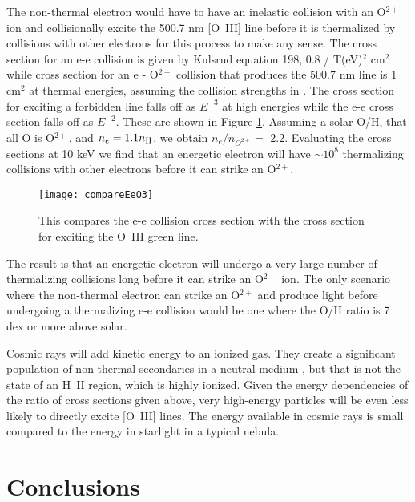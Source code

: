 \documentclass[debug, preprint, twocolumn]{rmaa}
\begin{document}
The non-thermal electron would have to have an inelastic collision with an 
O$^{2+}$ ion and collisionally excite the   500.7 nm [O~III] line 
before it is thermalized by collisions with other electrons for this process to make any sense.  
The cross section for an e-e collision is given by Kulsrud equation 198, 0.8  / T(eV)$^2$ cm$^2$ 
while cross section for an e - O$^{2+}$ collision that produces the 500.7 nm line is 1 cm$^2$
at thermal energies, 
assuming the collision strengths in \citet{1994A&AS..103..273L}.  
The cross section for exciting a forbidden line falls off as $E^{-3}$
at high energies \citep{1992A&A...254..436B} 
while the e-e cross section falls off as $E^{-2}$.
These are shown in Figure \ref{fig:compareEeO3}.
Assuming a solar O/H, that all O is O$^{2+}$, and $n_e = 1.1 n_{\rm H}$, 
we obtain $n_e / n_{O^{2+}} =$ 2.2.
Evaluating the cross sections at 10 keV we find that
an energetic electron will have $\sim 10^8$ 
thermalizing collisions with other electrons before it can strike an O$^{2+}$.  


\begin{figure}[t]
\texttt{[image: compareEeO3]}
\caption[Comparing e-e with \[O III\] collision cross sections]{This compares the e-e collision cross section
with the cross section for exciting the O~III green line.}
\label{fig:compareEeO3}
\end{figure}


The result is that an energetic electron will undergo a very large number of thermalizing collisions
long before it can strike an O$^{2+}$ ion.  
The only scenario where the non-thermal electron can strike an O$^{2+}$ and produce light 
before undergoing a thermalizing  e-e collision would be one where the O/H ratio is 
7 dex or more above solar.

Cosmic rays will add kinetic energy to an ionized gas.
They  create a significant population of non-thermal
secondaries in a neutral medium \citep{1968ApJ...152..971S}, but that is not the state of an H~II region,
which is highly ionized.
Given the energy dependencies of the ratio of cross sections given above, very high-energy particles will be even
less likely to directly excite [O~III] lines.
The energy available in cosmic rays is small compared to the energy in starlight in a
typical nebula.

\section{Conclusions}
\label{sec:conclusions}
\end{document}
